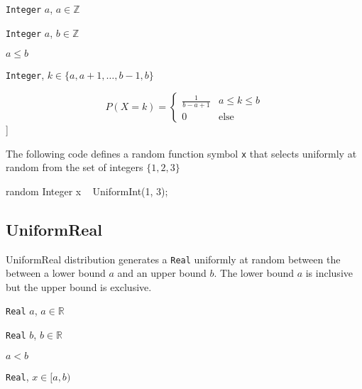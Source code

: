 \begin{itemize*}
\item[] \verb|Integer| $a$, $a \in \mathbb{Z}$
\item[] \verb|Integer| $a$, $b \in \mathbb{Z}$
\item[] $a \leq b$
 
\end{itemize*}

\begin{itemize*}
\item[] \verb|Integer|, $k \in \{a, a+1, \ldots, b-1, b \}$ 
\end{itemize*}

\[
	P(X = k) = \left\{
		  \begin{array}{lr}
		    \frac{1}{b - a + 1} & a \leq k \leq b \\
		    0 					& \text{else}
		  \end{array}
		\right.
\]]

The following code defines a random function symbol \verb|x| that selects uniformly at random from the set of integers $\{1, 2, 3\}$

\begin{blogcode}
random Integer x ~ UniformInt(1, 3);
\end{blogcode}

\subsection{UniformReal}

UniformReal distribution generates a \verb|Real| uniformly at random between the between a lower bound $a$ and an upper bound $b$. The lower bound $a$ is inclusive but the upper bound is exclusive.

\begin{itemize*}
\item[] \verb|Real| $a$, $a \in \mathbb{R}$
\item[] \verb|Real| $b$, $b \in \mathbb{R}$
\item[] $a < b$
 
\end{itemize*}

\begin{itemize*}
\item[] \verb|Real|, $x \in [a, b)$ 
\end{itemize*}

